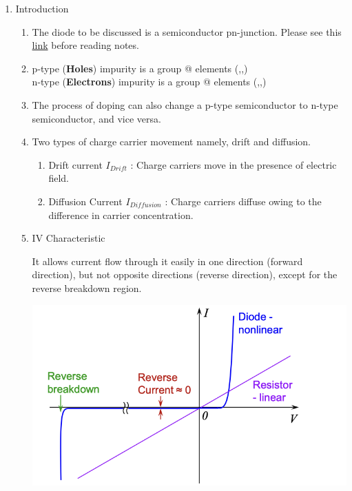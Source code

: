 \documentclass{article}
\makeatletter
\newcommand*{\rom}[1]{\expandafter\@slowromancap\romannumeral #1@}
\makeatother
\begin{document}
\begin{enumerate}
    \item Introduction
    \begin{enumerate}
        \item The diode to be discussed is a semiconductor pn-junction. Please see this \href{https://www.youtube.com/watch?v=Fwj_d3uO5g8}{link} before reading notes.
        \item p-type (\textbf{Holes}) impurity is a group \rom{3} elements (,,)\\
        n-type (\textbf{Electrons}) impurity is a group \rom{5} elements (,,)
        \item The process of doping can also change a p-type semiconductor to n-type semiconductor, and vice versa.
        \item Two types of charge carrier movement namely, drift and diffusion.
        \begin{enumerate}
            \item Drift current $I_{Drift}$ : Charge carriers move in the presence of electric field.
            \item Diffusion Current $I_{Diffusion}$ : Charge carriers diffuse owing to the difference in carrier concentration.
        \end{enumerate}
        \item IV Characteristic\\
            \begin{minipage}{0.4\textwidth}
            It allows current flow through it easily in one direction (forward direction), but not opposite directions (reverse direction), except for the reverse breakdown region.
            \end{minipage}
            \begin{minipage}{0.6\textwidth}
                \includegraphics[width=1\linewidth]{image/pnchar.png}

\end{minipage}
\end{enumerate}
\end{enumerate}
\end{document}
